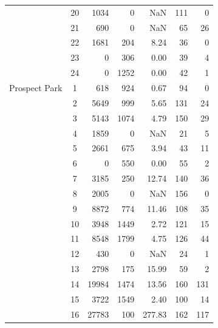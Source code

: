 \begin{table}[H]
\begin{tabular}{lcrrrrr}
{} &        20 &        1034 &         0 &       NaN &       111 &             0 \\
{} &        21 &         690 &         0 &       NaN &        65 &            26 \\
{} &        22 &        1681 &       204 &      8.24 &        36 &             0 \\
{} &        23 &           0 &       306 &      0.00 &        39 &             4 \\
{} &        24 &           0 &      1252 &      0.00 &        42 &             1 \\
\midrule
Prospect Park &         1 &         618 &       924 &      0.67 &        94 &             0 \\
{} &         2 &        5649 &       999 &      5.65 &       131 &            24 \\
{} &         3 &        5143 &      1074 &      4.79 &       150 &            29 \\
{} &         4 &        1859 &         0 &       NaN &        21 &             5 \\
{} &         5 &        2661 &       675 &      3.94 &        43 &            11 \\
{} &         6 &           0 &       550 &      0.00 &        55 &             2 \\
{} &         7 &        3185 &       250 &     12.74 &       140 &            36 \\
{} &         8 &        2005 &         0 &       NaN &       156 &             0 \\
{} &         9 &        8872 &       774 &     11.46 &       108 &            35 \\
{} &        10 &        3948 &      1449 &      2.72 &       121 &            15 \\
{} &        11 &        8548 &      1799 &      4.75 &       126 &            44 \\
{} &        12 &         430 &         0 &       NaN &        24 &             1 \\
{} &        13 &        2798 &       175 &     15.99 &        59 &             2 \\
{} &        14 &       19984 &      1474 &     13.56 &       160 &           131 \\
{} &        15 &        3722 &      1549 &      2.40 &       100 &            14 \\
{} &        16 &       27783 &       100 &    277.83 &       162 &           117 \\

\end{tabular}
\end{table}
